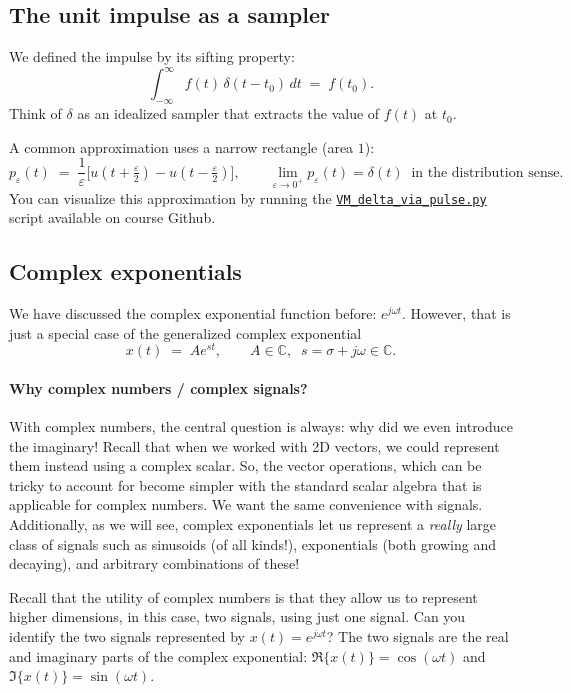 \documentclass{ee102_notes}
\begin{document}
\subsection{The unit impulse as a sampler}
We defined the impulse by its sifting property:
\[
\int_{-\infty}^{\infty} f(t)\,\delta(t-t_0)\,dt \;=\; f(t_0).
\]
Think of $\delta$ as an idealized sampler that extracts the value of $f(t)$ at $t_0$.

A common approximation uses a narrow rectangle (area $1$):
\[
p_\varepsilon(t)\;=\;\frac{1}{\varepsilon}\Big[u\!\left(t+\tfrac{\varepsilon}{2}\right)-u\!\left(t-\tfrac{\varepsilon}{2}\right)\Big],
\qquad \lim_{\varepsilon\to 0^+} p_\varepsilon(t) = \delta(t)\;\; \text{in the distribution sense.}
\]
You can visualize this approximation by running the \href{https://github.com/ee-ucmerced/ee102-signals-systems/blob/main/lecture\_notes/week2\_signal\_properties/VM_delta_via_pulse.py}{{\tt VM\_delta\_via\_pulse.py}} script available on course Github.

\subsection{Complex exponentials}
We have discussed the complex exponential function before: $e^{j\omega t}$. However, that is just a special case of the generalized complex exponential
\[
x(t) \;=\; A e^{s t}, \qquad A\in\mathbb{C},\;\; s=\sigma + j\omega \in \mathbb{C}.
\]
\paragraph{Why complex numbers / complex signals?} 

With complex numbers, the central question is always: why did we even introduce the imaginary! Recall that when we worked with 2D vectors, we could represent them instead using a complex scalar. So, the vector operations, which can be tricky to account for become simpler with the standard scalar algebra that is applicable for complex numbers. We want the same convenience with signals. Additionally, as we will see, complex exponentials let us represent a \emph{really} large class of signals such as sinusoids (of all kinds!), exponentials (both growing and decaying), and arbitrary combinations of these!

\begin{popquiz} Recall that the utility of complex numbers is that they allow us to represent higher dimensions, in this case, two signals, using just one signal. Can you identify the two signals represented by $x(t) = e^{j\omega t}$?
\popqsplit 
The two signals are the real and imaginary parts of the complex exponential: $\Re\{x(t)\} = \cos(\omega t)$ and $\Im\{x(t)\} = \sin(\omega t)$.
\end{popquiz}
\end{document}
